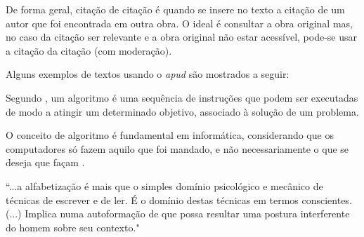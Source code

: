     De forma geral, citação de citação é quando se insere no texto a citação de um autor que foi encontrada em outra obra. 
    O ideal é consultar a obra original mas, no caso da citação ser relevante e a obra original não estar acessível, pode-se usar a citação da citação (com moderação).
    
    Alguns exemplos de textos usando o \emph{apud} são mostrados a seguir:
    
    Segundo , um algoritmo é uma sequência de instruções que podem ser executadas de modo a atingir um determinado objetivo, associado à solução de um problema.
    
    O conceito de algoritmo é fundamental em informática, considerando que os computadores só fazem aquilo que foi mandado, e não necessariamente o que se deseja que façam .
    
    \begin{citacao}
``...a alfabetização é mais que o simples domínio psicológico e mecânico de técnicas de escrever e de ler. É o domínio destas técnicas em termos conscientes. (...) Implica numa autoformação de que possa resultar uma postura interferente do homem sobre seu contexto."\ 
\end{citacao}
    

